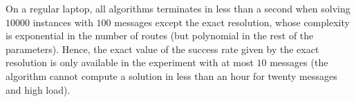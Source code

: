 \documentclass[a4paper,cleveref, autoref, thm-restate,UKenglish]{lipics-v2019}
\newcommand\firstfit{\texttt{First Fit}\xspace}
\newcommand\compactpair{\texttt{Compact Pairs}\xspace}
\newcommand\metaoffset{\texttt{Meta Offset}\xspace}
\newcommand\greedyuniform{\texttt{Greedy Uniform}\xspace}
\newcommand\compactfit{\texttt{Compact Fit}\xspace}
\begin{document}
On a regular laptop, all algorithms terminates in less than a second when solving $10000$ instances with $100$ messages except the exact resolution, whose complexity is exponential in the number of routes (but polynomial in the rest of the parameters). Hence, the exact value of the success rate given by the exact resolution is only available in the experiment with at most $10$ messages (the algorithm cannot compute a solution in less than an hour for twenty messages and high load). %
\end{document}
